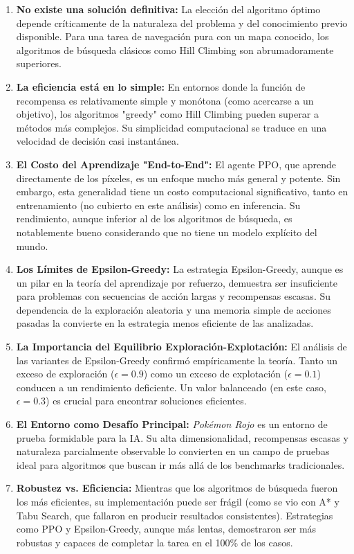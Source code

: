 \documentclass[12pt, oneside, openany]{book}
\begin{document}
\begin{enumerate}
    \item \textbf{No existe una solución definitiva:} La elección del algoritmo óptimo depende críticamente de la naturaleza del problema y del conocimiento previo disponible. Para una tarea de navegación pura con un mapa conocido, los algoritmos de búsqueda clásicos como Hill Climbing son abrumadoramente superiores.
    \item \textbf{La eficiencia está en lo simple:} En entornos donde la función de recompensa es relativamente simple y monótona (como acercarse a un objetivo), los algoritmos "greedy" como Hill Climbing pueden superar a métodos más complejos. Su simplicidad computacional se traduce en una velocidad de decisión casi instantánea.
    \item \textbf{El Costo del Aprendizaje "End-to-End":} El agente PPO, que aprende directamente de los píxeles, es un enfoque mucho más general y potente. Sin embargo, esta generalidad tiene un costo computacional significativo, tanto en entrenamiento (no cubierto en este análisis) como en inferencia. Su rendimiento, aunque inferior al de los algoritmos de búsqueda, es notablemente bueno considerando que no tiene un modelo explícito del mundo.
    \item \textbf{Los Límites de Epsilon-Greedy:} La estrategia Epsilon-Greedy, aunque es un pilar en la teoría del aprendizaje por refuerzo, demuestra ser insuficiente para problemas con secuencias de acción largas y recompensas escasas. Su dependencia de la exploración aleatoria y una memoria simple de acciones pasadas la convierte en la estrategia menos eficiente de las analizadas.
    \item \textbf{La Importancia del Equilibrio Exploración-Explotación:} El análisis de las variantes de Epsilon-Greedy confirmó empíricamente la teoría. Tanto un exceso de exploración ($\epsilon=0.9$) como un exceso de explotación ($\epsilon=0.1$) conducen a un rendimiento deficiente. Un valor balanceado (en este caso, $\epsilon=0.3$) es crucial para encontrar soluciones eficientes.
    \item \textbf{El Entorno como Desafío Principal:} \textit{Pokémon Rojo} es un entorno de prueba formidable para la IA. Su alta dimensionalidad, recompensas escasas y naturaleza parcialmente observable lo convierten en un campo de pruebas ideal para algoritmos que buscan ir más allá de los benchmarks tradicionales.
    \item \textbf{Robustez vs. Eficiencia:} Mientras que los algoritmos de búsqueda fueron los más eficientes, su implementación puede ser frágil (como se vio con A* y Tabu Search, que fallaron en producir resultados consistentes). Estrategias como PPO y Epsilon-Greedy, aunque más lentas, demostraron ser más robustas y capaces de completar la tarea en el 100\% de los casos.

\end{enumerate}
\end{document}
